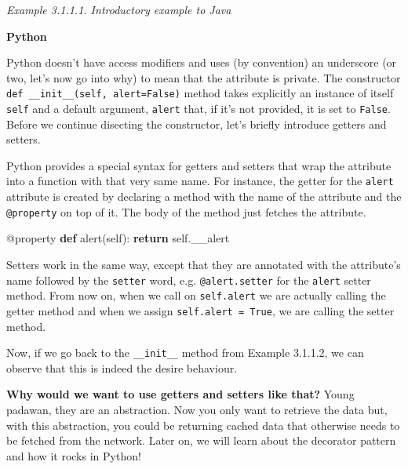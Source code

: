 \documentclass[]{article}
\newenvironment{Shaded}{\begin{snugshade}}{\end{snugshade}}
\newcommand{\KeywordTok}[1]{\textcolor[rgb]{0.13,0.29,0.53}{\textbf{{#1}}}}
\newcommand{\VariableTok}[1]{\textcolor[rgb]{0.00,0.00,0.00}{{#1}}}
\newcommand{\ControlFlowTok}[1]{\textcolor[rgb]{0.13,0.29,0.53}{\textbf{{#1}}}}
\newcommand{\AttributeTok}[1]{\textcolor[rgb]{0.77,0.63,0.00}{{#1}}}
\newcommand{\NormalTok}[1]{{#1}}
\begin{document}
\emph{Example 3.1.1.1. Introductory example to Java}

\textbf{Python}

Python doesn't have access modifiers and uses (by convention) an
underscore (or two, let's now go into why) to mean that the attribute is
private. The constructor \texttt{def\ \_\_init\_\_(self,\ alert=False)}
method takes explicitly an instance of itself \texttt{self} and a
default argument, \texttt{alert} that, if it's not provided, it is set
to \texttt{False}. Before we continue disecting the constructor, let's
briefly introduce getters and setters.

Python provides a special syntax for getters and setters that wrap the
attribute into a function with that very same name. For instance, the
getter for the \texttt{alert} attribute is created by declaring a method
with the name of the attribute and the \texttt{@property} on top of it.
The body of the method just fetches the attribute.

\begin{Shaded}
\begin{Highlighting}[]
    \AttributeTok{@property}
    \KeywordTok{def} \NormalTok{alert(}\VariableTok{self}\NormalTok{):}
      \ControlFlowTok{return} \VariableTok{self}\NormalTok{.__alert}
\end{Highlighting}
\end{Shaded}

Setters work in the same way, except that they are annotated with the
attribute's name followed by the \texttt{setter} word, e.g.
\texttt{@alert.setter} for the \texttt{alert} setter method. From now
on, when we call on \texttt{self.alert} we are actually calling the
getter method and when we assign \texttt{self.alert\ =\ True}, we are
calling the setter method.

Now, if we go back to the \texttt{\_\_init\_\_} method from Example
3.1.1.2, we can observe that this is indeed the desire behaviour.

\textbf{Why would we want to use getters and setters like that?} Young
padawan, they are an abstraction. Now you only want to retrieve the data
but, with this abstraction, you could be returning cached data that
otherwise needs to be fetched from the network. Later on, we will learn
about the decorator pattern and how it rocks in Python!
\end{document}
